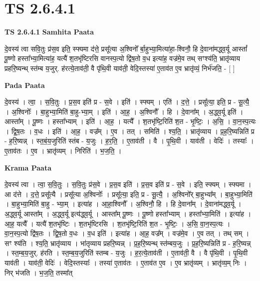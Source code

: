 \documentclass[17pt]{extarticle}
\begin{document}
\section{ TS 2.6.4.1 }

\textbf{TS 2.6.4.1 } \newline
\textbf{Samhita Paata} \newline

दे॒वस्य॑ त्वा सवि॒तुः प्र॑स॒व इति॒ स्फ्यमा द॑त्ते॒ प्रसू᳚त्या अ॒श्विनो᳚ र्बा॒हुभ्या॒मित्या॑हा॒-श्विनौ॒ हि दे॒वाना॑मद्ध्व॒र्यू आस्तां᳚ पू॒ष्णो हस्ता᳚भ्या॒मित्या॑ह॒ यत्यै॑ श॒तभृ॑ष्टिरसि वानस्प॒त्यो द्वि॑ष॒तो व॒ध इत्या॑ह॒ वज्र॑मे॒व तथ् सꣳश्य॑ति॒ भ्रातृ॑व्याय प्रहरि॒ष्यन्थ् स्त॑म्ब य॒जुर्. ह॑रत्ये॒ताव॑ती॒ वै पृ॑थि॒वी याव॑ती॒ वेदि॒स्तस्या॑ ए॒ताव॑त ए॒व भ्रातृ॑व्यं॒ निर्भ॑जति॒ - [  ] \newline

\textbf{Pada Paata} \newline

दे॒वस्य॑ । त्वा॒ । स॒वि॒तुः । प्र॒स॒व इति॑ प्र - स॒वे । इति॑ । स्फ्यम् । एति॑ । द॒त्ते॒ । प्रसू᳚त्या॒ इति॒ प्र - सू॒त्यै॒ । अ॒श्विनोः᳚ । बा॒हुभ्या॒मिति॑ बा॒हु-भ्या॒म् । इति॑ । आ॒ह॒ । अ॒श्विनौ᳚ । हि । दे॒वाना᳚म् । अ॒द्ध्व॒र्यू इति॑ । आस्ता᳚म् । पू॒ष्णः । हस्ता᳚भ्याम् । इति॑ । आ॒ह॒ । यत्यै᳚ । श॒तभृ॑ष्टि॒रिति॑ श॒त - भृ॒ष्टिः॒ । अ॒सि॒ । वा॒न॒स्प॒त्यः । द्वि॒ष॒तः । व॒धः । इति॑ । आ॒ह॒ । वज्र᳚म् । ए॒व । तत् । समिति॑ । श्य॒ति॒ । भ्रातृ॑व्याय । प्र॒ह॒रि॒ष्यन्निति॑ प्र - ह॒रि॒ष्यन्न् । स्त॒बं॒य॒जुरिति॑ स्तंब - य॒जुः । ह॒र॒ति॒ । ए॒ताव॑ती । वै । पृ॒थि॒वी । याव॑ती । वेदिः॑ । तस्याः᳚ । ए॒ताव॑तः । ए॒व । भ्रातृ॑व्यम् । निरिति॑ । भ॒ज॒ति॒ ।  \newline


\textbf{Krama Paata} \newline

दे॒वस्य॑ त्वा । त्वा॒ स॒वि॒तुः । स॒वि॒तुः प्र॑स॒वे । प्र॒स॒व इति॑ । प्र॒स॒व इति॑ प्र - स॒वे । इति॒ स्फ्यम् । स्फ्यमा । आ द॑त्ते । द॒त्ते॒ प्रसू᳚त्यै । प्रसू᳚त्या अ॒श्विनोः᳚ । प्रसू᳚त्या॒ इति॒ प्र - सू॒त्यै॒ । अ॒श्विनो᳚र् बा॒हुभ्या᳚म् । बा॒हुभ्या॒मिति॑ । बा॒हुभ्या॒मिति॑ बा॒हु - भ्या॒म् । इत्या॑ह । आ॒हा॒श्विनौ᳚ । अ॒श्विनौ॒ हि । हि दे॒वाना᳚म् । दे॒वाना॑मद्ध्व॒र्यू । अ॒द्ध्व॒र्यू आस्ता᳚म् । अ॒द्ध्व॒र्यू इत्य॑द्ध्व॒र्यू । आस्ता᳚म् पू॒ष्णः । पू॒ष्णो हस्ता᳚भ्याम् । हस्ता᳚भ्या॒मिति॑ । इत्या॑ह । आ॒ह॒ यत्यै᳚ । यत्यै॑ श॒तभृ॑ष्टिः । श॒तभृ॑ष्टिरसि । श॒तभृ॑ष्टि॒रिति॑ श॒त - भृ॒ष्टिः॒ । अ॒सि॒ वा॒न॒स्प॒त्यः । वा॒न॒स्प॒त्यो द्वि॑ष॒तः । द्वि॒ष॒तो व॒धः । व॒ध इति॑ । इत्या॑ह । आ॒ह॒ वज्र᳚म् । वज्र॑मे॒व । ए॒व तत् । तथ् सम् । सꣳ श्य॑ति । श्य॒ति॒ भ्रातृ॑व्याय । भा॑तृव्याय प्रहरि॒ष्यन्न् । प्र॒ह॒रि॒ष्यन्थ् स्त॑म्बय॒जुः । प्र॒ह॒रि॒ष्यन्निति॑ प्र - ह॒रि॒ष्यन्न् । स्त॒म्ब॒य॒जुर्. ह॑रति । स्त॒म्ब॒य॒जुरिति॑ स्तम्ब - य॒जुः । ह॒र॒त्ये॒ताव॑ती । ए॒ताव॑ती॒ वै । वै पृ॑थि॒वी । पृ॒थि॒वी याव॑ती । याव॑ती॒ वेदिः॑ । वेदि॒स्तस्याः᳚ । तस्या॑ ए॒ताव॑तः । ए॒ताव॑त ए॒व । ए॒व भ्रातृ॑व्यम् । भ्रातृ॑व्य॒म् निः । निर् भ॑जति । भ॒ज॒ति॒ तस्मा᳚त् \newline
\end{document}

